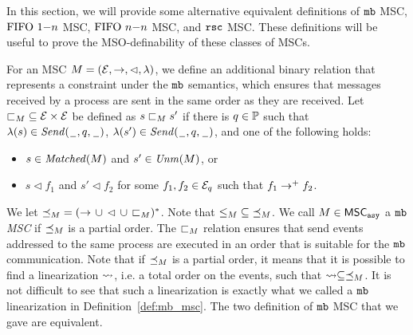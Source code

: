 In this section, we will provide some alternative equivalent definitions of $\mathtt{mb}$ MSC, $\text{FIFO } 1\mathsf{-}n$ MSC, $\text{FIFO } n\mathsf{-}n$ MSC, and $\mathtt{rsc}$ MSC. These definitions will be useful to prove the MSO-definability of these classes of MSCs.

\begin{definition} \label{def:n_one_alt}
	For an MSC $M = (\mathcal{E},\to,\lhd,\lambda)$, we define
	an additional binary relation that represents a constraint
	under the $\mathtt{mb}$ semantics, which ensures that messages received by a process are sent in the same order as they are received.
	Let ${\sqsubset}_M \subseteq \mathcal{E} \times \mathcal{E}$
	be defined as $s \sqsubset_M s'$ if there is $q \in \mathbb{P}$
	such that $\lambda(s) \in {\mathit{Send}(\hspace{0.1em}\underline{\hspace{0.5em}}\hspace{0.1em},q,\hspace{0.1em}\underline{\hspace{0.5em}}\hspace{0.1em})}$,
	$\lambda(s') \in {\mathit{Send}(\hspace{0.1em}\underline{\hspace{0.5em}}\hspace{0.1em},q,\hspace{0.1em}\underline{\hspace{0.5em}}\hspace{0.1em})}$, and one of the following holds:
	\begin{itemize}\itemsep=0.5ex
		\item $s \in \mathit{Matched}(M)$ and $s' \in \mathit{Unm}(M)$, or
		\item $s \lhd f_1$ and $s' \lhd f_2$ for some $f_1,f_2 \in \mathcal{E}_q$ such that $f_1 \to^+ f_2$.
	\end{itemize}
	
	We let ${\preceq_M} = ({\to} \,\cup\, {\lhd} \,\cup\, {\sqsubset_M})^\ast$.
	Note that ${\le_M} \subseteq {\preceq_M}$.
	We call $M \in \mathsf{MSC}_{\mathtt{asy}}$ a \emph{$\mathtt{mb}$ MSC}
	if ${\preceq_M}$ is a partial order. The ${\sqsubset}_M$ relation ensures that send events addressed to the same process are executed in an order that is suitable for the $\mathtt{mb}$ communication. Note that if ${\preceq_M}$ is a partial order, it means that it is possible to find a linearization $\rightsquigarrow$, i.e. a total order on the events, such that $\rightsquigarrow \subseteq \preceq_M$. It is not difficult to see that such a linearization is exactly what we called a $\mathtt{mb}$ linearization in Definition~\ref{def:mb_msc}. The two definition of $\mathtt{mb}$ MSC that we gave are equivalent.
\end{definition}
	

